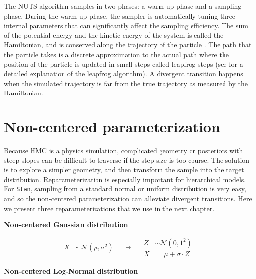 \documentclass[11pt, oneside, openany]{scrbook}
\begin{document}
The NUTS algorithm samples in two phases: a warm-up phase and a sampling phase. During the warm-up phase, the sampler is automatically tuning three internal parameters that can significantly affect the sampling efficiency. The sum of the potential energy and the kinetic energy of the system is called the Hamiltonian, and is conserved along the trajectory of the particle \citep{stanref}. The path that the particle takes is a discrete approximation to the actual path where the position of the particle is updated in small steps called leapfrog steps (see \citet{leimkuhler2004simulating} for a detailed explanation of the leapfrog algorithm). A divergent transition happens when the simulated trajectory is far from the true trajectory as measured by the Hamiltonian.

\hypertarget{non-centered-parameterization}{%
\section{Non-centered parameterization}\label{non-centered-parameterization}}

Because HMC is a physics simulation, complicated geometry or posteriors with steep slopes can be difficult to traverse if the step size is too course. The solution is to explore a simpler geometry, and then transform the sample into the target distribution. Reparameterization is especially important for hierarchical models. For \texttt{Stan}, sampling from a standard normal or uniform distribution is very easy, and so the non-centered parameterization can alleviate divergent transitions. Here we present three reparameterizations that we use in the next chapter.

\textbf{Non-centered Gaussian distribution}


\begin{equation}
  \begin{split}
    X &\sim \mathcal{N}(\mu, \sigma^2)
  \end{split}
\quad \Longrightarrow \quad
  \begin{split}
    Z &\sim \mathcal{N}(0, 1^2) \\
    X &= \mu + \sigma \cdot Z
  \end{split}
\label{eq:nc-normal}
\end{equation}

\textbf{Non-centered Log-Normal distribution}

\end{document}
